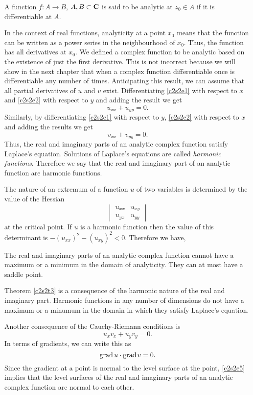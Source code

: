 \begin{defn}\label{c2s2d1}
A function $f:A \rightarrow B$, $A, B \subset \mathbf{C}$ is said to be analytic at
$z_0 \in A$ if it is differentiable at $A$. 
\end{defn}

In the context of real functions, analyticity at a point $x_0$ means that the
function can be written as a power series in the neighbourhood of $x_0$. Thus,
the function has all derivatives at $x_0$. We defined a complex function to
be analytic based on the existence of just the first derivative. This is not
incorrect because we will show in the next chapter that when a complex function
differentiable once is differentiable any number of times. Anticipating this
result, we can assume that all partial derivatives of $u$ and $v$ exist.
Differentiating \eqref{c2s2e1} with respect to $x$ and \eqref{c2s2e2} with
respect to $y$ and adding the result we get
\begin{equation}\label{c2s2e3}
u_{xx} + u_{yy} = 0.
\end{equation}
Similarly, by differentiating \eqref{c2s2e1} with respect to $y$, \eqref{c2s2e2}
with respect to $x$ and adding the results we get
\begin{equation}\label{c2s2e4}
v_{xx} + v_{yy} = 0.
\end{equation}
Thus, the real and imaginary parts of an analytic complex function satisfy
Laplace's equation. Solutions of Laplace's equations are called \emph{harmonic
functions}. Therefore we say that the real and imaginary part of an analytic
function are harmonic functions.

The nature of an extremum of a function $u$ of two variables is determined by 
the value of the Hessian 
\[
\begin{vmatrix} u_{xx} & u_{xy} \\ u_{yx} & u_{yy} \end{vmatrix}
\]
at the critical point. If $u$ is a harmonic function then the value of
this determinant is $-(u_{xx})^2 - (u_{xy})^2 < 0$. Therefore we have,
\begin{thm}\label{c2s2t3}
The real and imaginary parts of an analytic complex function cannot have a 
maximum or a minimum in the domain of analyticity. They can at most have a 
saddle point.
\end{thm}

\begin{rem}
Theorem \ref{c2s2t3} is a consequence of the harmonic nature of the real and
imaginary part. Harmonic functions in any number of dimensions do not have
a maximum or a minumum in the domain in which they satisfy Laplace's equation.
\end{rem}

Another consequence of the Cauchy-Riemann conditions is 
\[
u_xv_x + u_yv_y = 0.
\]
In terms of gradients, we can write this as
\begin{equation}\label{c2s2e5}
\operatorname{grad} u \cdot \operatorname{grad} v = 0.
\end{equation}
Since the gradient at a point is normal to the level surface at the point,
\eqref{c2s2e5} implies that the level surfaces of the real and imaginary parts
of an analytic complex function are normal to each other.

